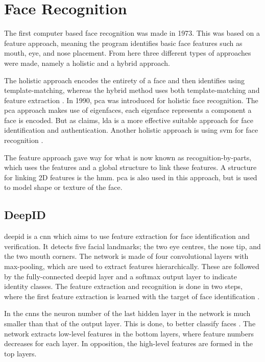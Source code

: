 \section{Face Recognition}
The first computer based face recognition was made in 1973. This was based on a feature approach, meaning the program identifies basic face features such as mouth, eye, and nose placement. 
From here three different types of approaches were made, namely a holistic and a hybrid approach. 

The holistic approach encodes the entirety of a face and then identifies using template-matching, whereas the hybrid method uses both template-matching and feature extraction \citep{Wechsler2007}.
In 1990, \gls{pca} was introduced for holistic face recognition. The \gls{pca} approach makes use of eigenfaces, each eigenface represents a component a face is encoded. But as \cite{Wechsler2007} claims, \gls{lda} is a more effective suitable approach for face identification and authentication. Another holistic approach is using \gls{svm} for face recognition \citep{Wechsler2007}.

The feature approach gave way for what is now known as recognition-by-parts, which uses the features and a global structure to link these features. A structure for linking 2D features is the \gls{hmm}. \gls{pca} is also used in this approach, but is used to model shape or texture of the face.

\subsection{DeepID}
\gls{deepid} is a \gls{cnn} which aims to use feature extraction for face identification and verification. It detects five facial landmarks; the two eye centres, the nose tip, and the two mouth corners. The network is made of four convolutional layers with max-pooling, which are used to extract features hierarchically. These are followed by the fully-connected \gls{deepid} layer and a softmax output layer to indicate identity classes. The feature extraction and recognition is done in two steps, where the first feature extraction is learned with the target of face identification \citep{deepID2014}.

In the \gls{cnn}s the neuron number of the last hidden layer in the network is much smaller than that of the output layer. This is done, to better classify faces \citep{deepID2014}. The network extracts low-level features in the bottom layers, where feature numbers decreases for each layer. In opposition, the high-level features are formed in the top layers.

